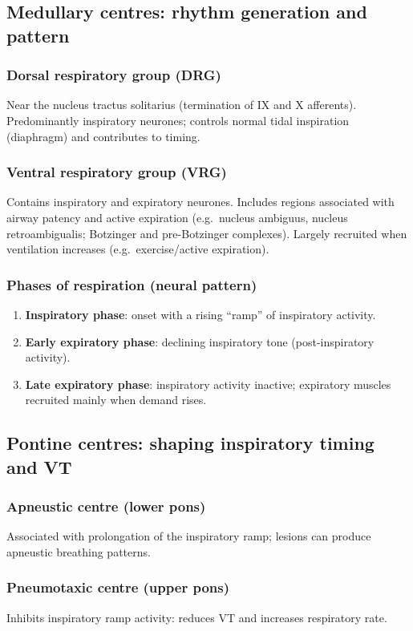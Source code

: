 \documentclass[11pt,a4paper]{article}
\begin{document}
\subsection{Medullary centres: rhythm generation and pattern}
\subsubsection{Dorsal respiratory group (DRG)}
Near the nucleus tractus solitarius (termination of IX and X afferents). Predominantly inspiratory neurones; controls normal tidal inspiration (diaphragm) and contributes to timing.

\subsubsection{Ventral respiratory group (VRG)}
Contains inspiratory and expiratory neurones. Includes regions associated with airway patency and active expiration (e.g.\ nucleus ambiguus, nucleus retroambigualis; Botzinger and pre-Botzinger complexes). Largely recruited when ventilation increases (e.g.\ exercise/active expiration).

\subsubsection{Phases of respiration (neural pattern)}
\begin{enumerate}
  \item \textbf{Inspiratory phase}: onset with a rising ``ramp'' of inspiratory activity.
  \item \textbf{Early expiratory phase}: declining inspiratory tone (post-inspiratory activity).
  \item \textbf{Late expiratory phase}: inspiratory activity inactive; expiratory muscles recruited mainly when demand rises.
\end{enumerate}

\subsection{Pontine centres: shaping inspiratory timing and VT}
\subsubsection{Apneustic centre (lower pons)}
Associated with prolongation of the inspiratory ramp; lesions can produce apneustic breathing patterns.

\subsubsection{Pneumotaxic centre (upper pons)}
Inhibits inspiratory ramp activity: reduces VT and increases respiratory rate.
\end{document}
